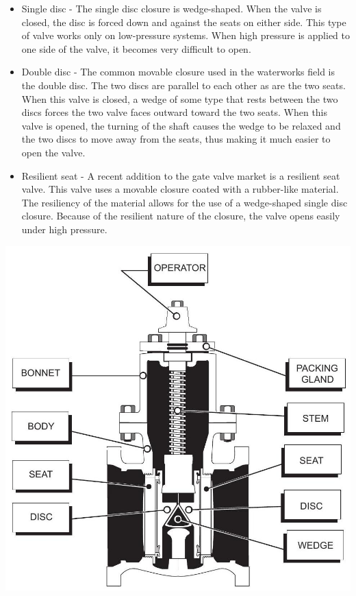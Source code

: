 \documentclass[10pt]{article}
\begin{document}
\begin{itemize}
  \item Single disc - The single disc closure is wedge-shaped. When the valve is closed, the disc is forced down and against the seats on either side. This type of valve works only on low-pressure systems. When high pressure is applied to one side of the valve, it becomes very difficult to open.

  \item Double disc - The common movable closure used in the waterworks field is the double disc. The two discs are parallel to each other as are the two seats. When this valve is closed, a wedge of some type that rests between the two discs forces the two valve faces outward toward the two seats. When this valve is opened, the turning of the shaft causes the wedge to be relaxed and the two discs to move away from the seats, thus making it much easier to open the valve.

  \item Resilient seat - A recent addition to the gate valve market is a resilient seat valve. This valve uses a movable closure coated with a rubber-like material. The resiliency of the material allows for the use of a wedge-shaped single disc closure. Because of the resilient nature of the closure, the valve opens easily under high pressure.

\end{itemize}
\includegraphics[max width=\textwidth]{GateValveDoubleDiskInside}
\end{document}
